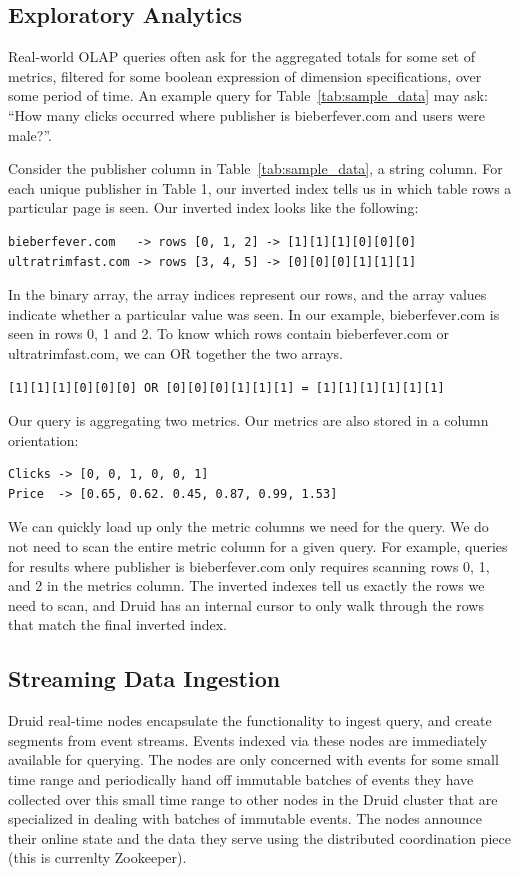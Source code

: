 \documentclass{vldb}
\begin{document}
{\subsection{Exploratory Analytics}

Real-world OLAP queries often ask for the aggregated totals for some set of
metrics, filtered for some boolean expression of dimension specifications,
over some period of time. An example query for Table~\ref{tab:sample_data} may
ask: “How many clicks occurred where publisher is bieberfever.com and users
were male?”. 

Consider the publisher column in Table~\ref{tab:sample_data}, a string column.
For each unique publisher in Table 1, our inverted index tells us in which
table rows a particular page is seen. Our inverted index looks like the
following:

{\small\begin{verbatim}
bieberfever.com   -> rows [0, 1, 2] -> [1][1][1][0][0][0]
ultratrimfast.com -> rows [3, 4, 5] -> [0][0][0][1][1][1]
\end{verbatim}}

In the binary array, the array indices represent our rows, and the array values
indicate whether a particular value was seen. In our example, bieberfever.com
is seen in rows 0, 1 and 2. To know which rows contain bieberfever.com or
ultratrimfast.com, we can OR together the two arrays.

{\small\begin{verbatim}
[1][1][1][0][0][0] OR [0][0][0][1][1][1] = [1][1][1][1][1][1]
\end{verbatim}}

Our query is aggregating two metrics. Our metrics are also stored in a column
orientation:

{\small\begin{verbatim}
Clicks -> [0, 0, 1, 0, 0, 1]
Price  -> [0.65, 0.62. 0.45, 0.87, 0.99, 1.53]
\end{verbatim}}

We can quickly load up only the metric columns we need for the query. We do not
need to scan the entire metric column for a given query. For example, queries
for results where publisher is bieberfever.com only requires scanning rows 0,
1, and 2 in the metrics column. The inverted indexes tell us exactly the rows
we need to scan, and Druid has an internal cursor to only walk through the rows
that match the final inverted index.

\subsection{Streaming Data Ingestion}
Druid real-time nodes encapsulate the functionality to ingest query, and create
segments from event streams. Events indexed via these nodes are immediately
available for querying.  The nodes are only concerned with events for some
small time range and periodically hand off immutable batches of events they
have collected over this small time range to other nodes in the Druid cluster
that are specialized in dealing with batches of immutable events. The nodes
announce their online state and the data they serve using the distributed
coordination piece (this is currenlty Zookeeper\cite{hunt2010zookeeper}).

}
\end{document}
